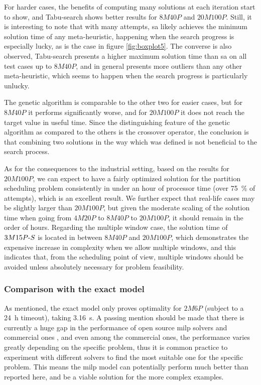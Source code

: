 \documentclass[main.tex]{subfiles}
\begin{document}
For harder cases, the benefits of computing many solutions at each iteration start to show, and Tabu-search shows better results for $8M40P$ and $20M100P$.
Still, it is interesting to note that with many attempts, \gls{sa} likely achieves the minimum solution time of any meta-heuristic, happening when the search progress is especially lucky, as is the case in figure \ref{fig:boxplot5}.
The converse is also observed, Tabu-search presents a higher maximum solution time than \gls{sa} on all test cases up to $8M40P$, and in general presents more outliers than any other meta-heuristic, which seems to happen when the search progress is particularly unlucky.

The genetic algorithm is comparable to the other two for easier cases, but for $8M40P$ it performs significantly worse, and for $20M100P$ it does not reach the target value in useful time.
Since the distinguishing feature of the genetic algorithm as compared to the others is the crossover operator, the conclusion is that combining two solutions in the way which was defined is not beneficial to the search process.

As for the consequences to the industrial setting, based on the results for $20M100P$, we can expect to have a fairly optimized solution for the partition scheduling problem consistently in under an hour of processor time (over \SI{75}{\percent} of attempts), which is an excellent result.
We further expect that real-life cases may be slightly larger than $20M100P$, but given the moderate scaling of the solution time when going from $4M20P$ to $8M40P$ to $20M100P$, it should remain in the order of hours.
Regarding the multiple window case, the solution time of $3M15P\text{-} S$ is located in between $8M40P$ and $20M100P$, which demonstrates the expensive increase in complexity when we allow multiple windows, and this indicates that, from the scheduling point of view, multiple windows should be avoided unless absolutely necessary for problem feasibility.



\subsubsection{Comparison with the exact model}

As mentioned, the exact model only proves optimality for $2M6P$ (subject to a \SI{24}{\hour} timeout), taking \SI{3.16}{\second}.
A passing mention should be made that there is currently a huge gap in the performance of open source \gls{milp} solvers and commercial ones \cite{meindl2012analysis}, and even among the commercial ones, the performance varies greatly depending on the specific problem, thus it is common practice to experiment with different solvers to find the most suitable one for the specific problem.
This means the \gls{milp} model can potentially perform much better than reported here, and be a viable solution for the more complex examples.
\end{document}
